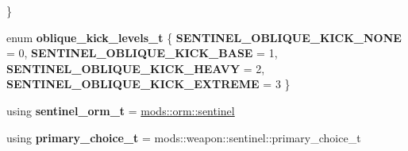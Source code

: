 \begin{DoxyCompactItemize}
 \}
\item 
\mbox{\label{structmods_1_1classes_1_1sentinel_ac04188fefab2b501696303eb5ab3c125}} 
enum {\bfseries oblique\+\_\+kick\+\_\+levels\+\_\+t} \{ {\bfseries S\+E\+N\+T\+I\+N\+E\+L\+\_\+\+O\+B\+L\+I\+Q\+U\+E\+\_\+\+K\+I\+C\+K\+\_\+\+N\+O\+NE} = 0, 
{\bfseries S\+E\+N\+T\+I\+N\+E\+L\+\_\+\+O\+B\+L\+I\+Q\+U\+E\+\_\+\+K\+I\+C\+K\+\_\+\+B\+A\+SE} = 1, 
{\bfseries S\+E\+N\+T\+I\+N\+E\+L\+\_\+\+O\+B\+L\+I\+Q\+U\+E\+\_\+\+K\+I\+C\+K\+\_\+\+H\+E\+A\+VY} = 2, 
{\bfseries S\+E\+N\+T\+I\+N\+E\+L\+\_\+\+O\+B\+L\+I\+Q\+U\+E\+\_\+\+K\+I\+C\+K\+\_\+\+E\+X\+T\+R\+E\+ME} = 3
 \}
\item 
\mbox{\label{structmods_1_1classes_1_1sentinel_a413808db67bacaf72fa0c582fc7cf392}} 
using {\bfseries sentinel\+\_\+orm\+\_\+t} = \hyperlink{structmods_1_1orm_1_1sentinel}{mods\+::orm\+::sentinel}
\item 
\mbox{\label{structmods_1_1classes_1_1sentinel_ae6acac73fa85700f60e7ce2183fa03f1}} 
using {\bfseries primary\+\_\+choice\+\_\+t} = mods\+::weapon\+::sentinel\+::primary\+\_\+choice\+\_\+t
\end{DoxyCompactItemize}
